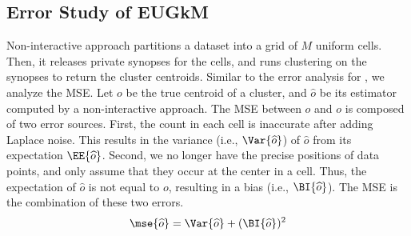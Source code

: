 \begin{comment}
The optimal proportion improves the MSE of \dpl. Plugging it back in Equation \ref{eqn:DPLMSEsumOi}, it follows that
\begin{equation}\label{eqn:improvedDPLMSE}
\mse{\widehat{o}}\approx 2\left(\frac{rkt}{N\epsilon}\right)^2 \left(d+\sqrt[3]{4d\beta^2}\right)^3,
\end{equation}
which is consistently lower than the MSE in Equation \ref{eqn:DPLMSE_approx} developed for the original \dpl.

We use \dplscopt to represent the \dpl method that has the above improved privacy budget allocation between sum and count functions. \todo{Experiments to show the improvements...}
\end{comment}

\subsection{Error Study of EUGkM}\label{sec:non_inter_analysis}

Non-interactive approach partitions a dataset into a grid of $M$ uniform cells. Then, it releases private synopses for the cells, and runs \km clustering on the synopses to return the cluster centroids. 
Similar to the error analysis for \dpl, we analyze the MSE. Let $o$ be the true centroid of a cluster, and $\widehat{o}$ be its estimator computed by a non-interactive approach. The MSE between $\widehat{o}$ and $o$ is composed of two error sources. First, the count in each cell is inaccurate after adding Laplace noise. This results in the variance (i.e., $\Var{\widehat{o}}$) of $\widehat{o}$ from its expectation $\EE{\widehat{o}}$. Second, we no longer have the precise positions of data points, and only assume that they occur at the center in a cell. Thus, the expectation of $\widehat{o}$ is not equal to $o$, resulting in a bias (i.e., $\BI{\widehat{o}}$). The MSE is the combination of these two errors.
\begin{equation}\label{eqn:mse}
\mse{\widehat{o}}  =  \Var{\widehat{o}} + (\BI{\widehat{o}})^2
\end{equation}



